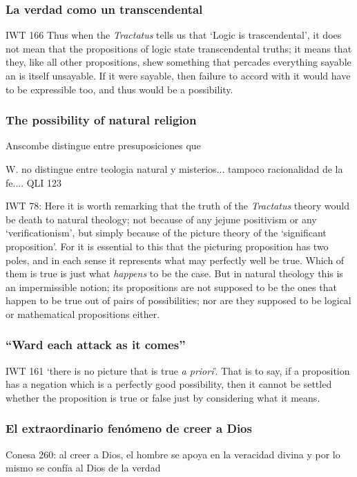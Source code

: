 \subsubsection{La verdad como un transcendental}

IWT 166 Thus when the \emph{Tractatus} tells us that `Logic is trascendental', it does not mean that the propositions of logic state transcendental truths; it means that they, like all other propositions, shew something that percades everything sayable an is itself unsayable. If it were sayable, then failure to accord with it would have to be expressible too, and thus would be a possibility.

\subsubsection{The possibility of natural religion}

Anscombe distingue entre presuposiciones que

W. no distingue entre teologia natural y misterios... tampoco racionalidad de la fe.... QLI 123



IWT 78: Here it is worth remarking that the truth of the \emph{Tractatus} theory would be death to natural theology; not because of any jejune positivism or any `verificationism', but simply because of the picture theory of the `significant proposition'. For it is essential to this that the picturing proposition has two poles, and in each sense it represents what may perfectly well be true. Which of them is true is just what \emph{happens} to be the case. But in natural theology this is an impermissible notion; its propositions are not supposed to be the ones that happen to be true out of pairs of possibilities; nor are they supposed to be logical or mathematical propositions either.

\subsubsection{``Ward each attack as it comes''}

IWT 161 `there is no picture that is true \emph{a priori}'. That is to say, if a proposition has a negation which is a perfectly good possibility, then it cannot be settled whether the proposition is true or false just by considering what it means.

\subsubsection{El extraordinario fenómeno de creer a Dios}

Conesa 260: al creer a Dios, el hombre se apoya en la veracidad divina  y por lo mismo se confía al Dios de la verdad
